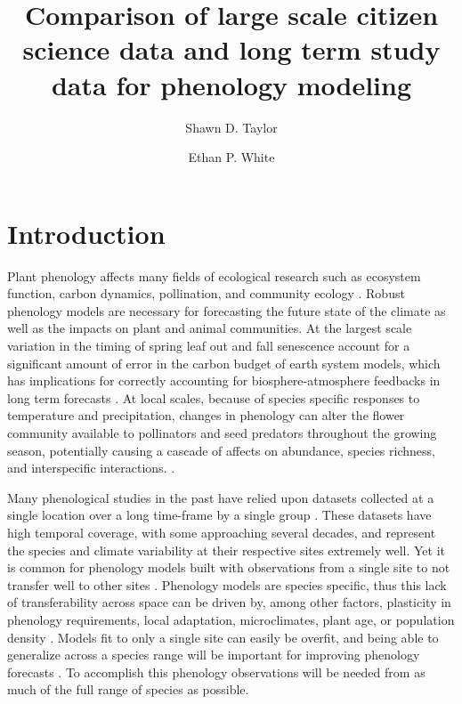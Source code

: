 \documentclass[fleqn,10pt,lineno]{wlpeerj} %
\title{Comparison of large scale citizen science data and long term study data for phenology modeling}
\author[1]{Shawn D. Taylor}
\author[2]{Ethan P. White}
\affil[1]{UFL}
\affil[2]{UFL}
\begin{document}
\flushbottom
\maketitle
\thispagestyle{empty}

\section*{Introduction}


Plant phenology affects many fields of ecological research such as ecosystem function, carbon dynamics, pollination, and community ecology \citep{richardson2013, cleland2007, tang2016}. Robust phenology models are necessary for forecasting the future state of the climate as well as the impacts on plant and animal communities. At the largest scale variation in the timing of spring leaf out and fall senescence account for a significant amount of error in the carbon budget of earth system models, which has implications for correctly accounting for biosphere-atmosphere feedbacks in long term forecasts \citep{richardson2012}. At local scales, because of species specific responses to temperature and precipitation, changes in phenology can alter the flower community available to pollinators and seed predators throughout the growing season, potentially causing a cascade of affects on abundance, species richness, and interspecific interactions. \citep{diez2012, caradonna2014, ogilvie2017, theobald2017}. 

Many phenological studies in the past have relied upon datasets collected at a single location over a long time-frame by a single group \citep{cook2012, roberts2015, iler2013, wolkovich2012}. These datasets have high temporal coverage, with some approaching several decades, and represent the species and climate variability at their respective sites extremely well. Yet it is common for phenology models built with observations from a single site to not transfer well to other sites \citep{garcia-mozo2008, xu2013, olsson2014, basler2016}. Phenology models are species specific, thus this lack of transferability across space can be driven by, among other factors, plasticity in phenology requirements, local adaptation, microclimates, plant age, or population density \citep{kramer1995,diez2012}. Models fit to only a single site can easily be overfit, and being able to generalize across a species range will be important for improving phenology forecasts \citep{richardson2013}. To accomplish this phenology observations will be needed from as much of the full range of species as possible. 
\end{document}
